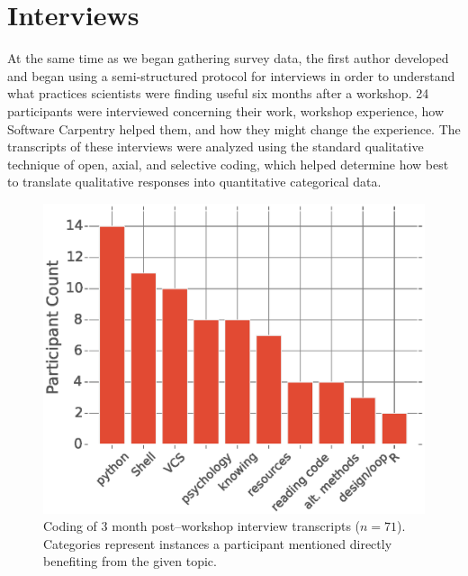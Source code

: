 \documentclass[10pt, twocolumn]{article}
\begin{document}
	\section{Interviews}
	
	At the same time as we began gathering survey data,
	the first author developed and began using a semi-structured protocol for interviews
	in order to understand what practices scientists were finding useful six months after a workshop.
	24 participants were interviewed concerning their work,
	workshop experience,
	how Software Carpentry helped them,
	and how they might change the experience.
	The transcripts of these interviews were analyzed
	using the standard qualitative technique of open, axial, and selective coding,
	which helped determine how best to translate qualitative responses into quantitative categorical data.
	
	\begin{figure}
	\centering
	\includegraphics[width=\linewidth]{figures/InterviewResponses}
	\caption{
	    Coding of 3 month post--workshop interview transcripts ($n=71$).
	    Categories represent instances a participant mentioned
	    directly benefiting from the given topic.
	}
	\label{InterviewResponses}
	\end{figure}

	\begin{figure}
    \end{figure}
	
\end{document}
